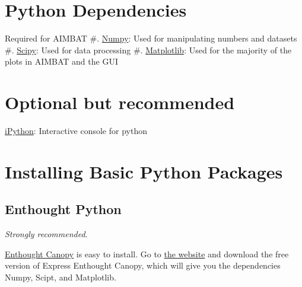 \documentclass[letterpaper,10pt,english]{sphinxmanual}
\begin{document}
\section{Python Dependencies}
\label{docfiles/install_dependencies:python-dependencies}
Required for AIMBAT
\#. \href{http://www.numpy.org/}{Numpy}: Used for manipulating numbers and datasets
\#. \href{http://www.scipy.org/}{Scipy}: Used for data processing
\#. \href{http://matplotlib.org/}{Matplotlib}: Used for the majority of the plots in AIMBAT and the GUI


\section{Optional but recommended}
\label{docfiles/install_dependencies:optional-but-recommended}
\href{http://ipython.org/}{iPython}: Interactive console for python


\section{Installing Basic Python Packages}
\label{docfiles/install_dependencies:installing-basic-python-packages}

\subsection{Enthought Python}
\label{docfiles/install_dependencies:enthought-python}
\emph{Strongly recommended}.

\href{https://www.enthought.com/store/}{Enthought Canopy} is easy to install. Go to \href{https://www.enthought.com/store/}{the website} and download the free version of Express Enthought Canopy, which will give you the dependencies Numpy, Scipt, and Matplotlib.
\end{document}
